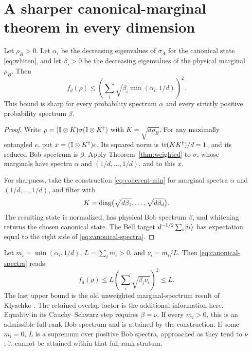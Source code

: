 \section{A sharper canonical-marginal theorem in every dimension}\label{sec:highdim}
\begin{theorem}\label{thm:canonical-spectra}
Let $\rho_B>0$. Let $\alpha_i$ be the decreasing eigenvalues of $\sigma_A$ for the canonical state \eqref{eq:whiten}, and let $\beta_i>0$ be the decreasing eigenvalues of the physical marginal $\rho_B$. Then
\begin{equation}\label{eq:canonical-spectra}
 \boxed{\quad f_d(\rho)\le
 \left(\sum_i\sqrt{\beta_i\min(\alpha_i,1/d)}\right)^2.\quad}
\end{equation}
This bound is sharp for every probability spectrum $\alpha$ and every strictly positive probability spectrum $\beta$.
\end{theorem}
\begin{proof}
Write $\rho=(\mathbb I\otimes K)\sigma(\mathbb I\otimes K^\dagger)$ with $K=\sqrt{d\rho_B}$. For any maximally entangled $e$, put $x=(\mathbb I\otimes K^\dagger)e$. Its squared norm is $\operatorname{tr}(KK^\dagger)/d=1$, and its reduced Bob spectrum is $\beta$. Apply Theorem~\ref{thm:weighted} to $\sigma$, whose marginals have spectra $\alpha$ and $(1/d,\ldots,1/d)$, and to this $x$.

For sharpness, take the construction \eqref{eq:coherent-min} for marginal spectra $\alpha$ and $(1/d,\ldots,1/d)$, and filter with
\[
 K=\operatorname{diag}\bigl(\sqrt{d\beta_1},\ldots,\sqrt{d\beta_d}\bigr).
\]
The resulting state is normalized, has physical Bob spectrum $\beta$, and whitening returns the chosen canonical state. The Bell target $d^{-1/2}\sum_i\lvert ii\rangle$ has expectation equal to the right side of \eqref{eq:canonical-spectra}.\end{proof}

Let $m_i=\min(\alpha_i,1/d)$, $L=\sum_i m_i>0$, and $\nu_i=m_i/L$. Then \eqref{eq:canonical-spectra} reads
\begin{equation}\label{eq:affinity}
 f_d(\rho)\le L\left(\sum_i\sqrt{\beta_i\nu_i}\right)^2\le L.
\end{equation}
The last upper bound is the old unweighted marginal-spectrum result of Klyachko \cite{klyachko}. The retained overlap factor is the additional information here. Equality in its Cauchy--Schwarz step requires $\beta=\nu$. If every $m_i>0$, this is an admissible full-rank Bob spectrum and is attained by the construction. If some $m_i=0$, $L$ is a supremum over positive Bob spectra, approached as they tend to $\nu$; it cannot be attained within that full-rank stratum.

